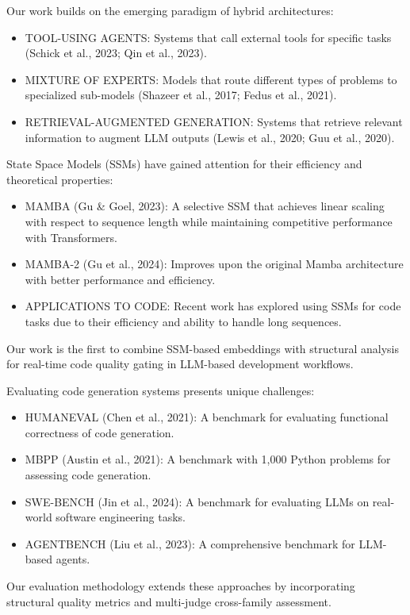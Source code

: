 
Our work builds on the emerging paradigm of hybrid architectures:

\begin{itemize}
    \item TOOL-USING AGENTS: Systems that call external tools for specific tasks (Schick et al., 2023; Qin et al., 2023).
    \item MIXTURE OF EXPERTS: Models that route different types of problems to specialized sub-models (Shazeer et al., 2017; Fedus et al., 2021).
    \item RETRIEVAL-AUGMENTED GENERATION: Systems that retrieve relevant information to augment LLM outputs (Lewis et al., 2020; Guu et al., 2020).
\end{itemize}


State Space Models (SSMs) have gained attention for their efficiency and theoretical properties:

\begin{itemize}
    \item MAMBA (Gu & Goel, 2023): A selective SSM that achieves linear scaling with respect to sequence length while maintaining competitive performance with Transformers.
    \item MAMBA-2 (Gu et al., 2024): Improves upon the original Mamba architecture with better performance and efficiency.
    \item APPLICATIONS TO CODE: Recent work has explored using SSMs for code tasks due to their efficiency and ability to handle long sequences.
\end{itemize}

Our work is the first to combine SSM-based embeddings with structural analysis for real-time code quality gating in LLM-based development workflows.


Evaluating code generation systems presents unique challenges:

\begin{itemize}
    \item HUMANEVAL (Chen et al., 2021): A benchmark for evaluating functional correctness of code generation.
    \item MBPP (Austin et al., 2021): A benchmark with 1,000 Python problems for assessing code generation.
    \item SWE-BENCH (Jin et al., 2024): A benchmark for evaluating LLMs on real-world software engineering tasks.
    \item AGENTBENCH (Liu et al., 2023): A comprehensive benchmark for LLM-based agents.
\end{itemize}

Our evaluation methodology extends these approaches by incorporating structural quality metrics and multi-judge cross-family assessment.

